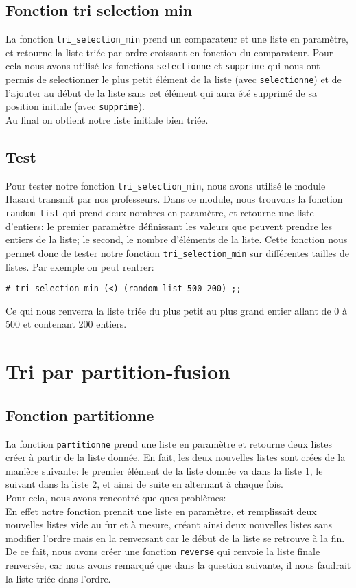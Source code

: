 \documentclass[a4paper, 11pt]{article}
\begin{document}
\subsection{Fonction tri selection min}
La fonction \texttt{tri\_selection\_min} prend un comparateur et une liste en paramètre, et retourne la liste triée par ordre croissant en fonction du comparateur. Pour cela nous avons utilisé les fonctions \texttt{selectionne} et \texttt{supprime} qui nous ont permis de selectionner le plus petit élément de la liste (avec \texttt{selectionne}) et de l'ajouter au début de la liste sans cet élément qui aura été supprimé de sa position initiale (avec \texttt{supprime}).\\
Au final on obtient notre liste initiale bien triée.
\subsection{Test}
Pour tester notre fonction \texttt{tri\_selection\_min}, nous avons utilisé le module Hasard transmit par nos professeurs. Dans ce module, nous trouvons la fonction \texttt{random\_list} qui prend deux nombres en paramètre, et retourne une liste d'entiers: le premier paramètre définissant les valeurs que peuvent prendre les entiers de la liste; le second, le nombre d'éléments de la liste.
Cette fonction nous permet donc de tester notre fonction \texttt{tri\_selection\_min} sur différentes tailles de listes. Par exemple on peut rentrer:\begin{verbatim}
# tri_selection_min (<) (random_list 500 200) ;;
\end{verbatim} 
Ce qui nous renverra la liste triée du plus petit au plus grand entier allant de 0 à 500 et contenant 200 entiers.
\section{Tri par partition-fusion}
\subsection{Fonction partitionne}
La fonction \texttt{partitionne} prend une liste en paramètre et retourne deux listes créer à partir de la liste donnée. En fait, les deux nouvelles listes sont crées de la manière suivante: le premier élément de la liste donnée va dans la liste 1, le suivant dans la liste 2, et ainsi de suite en alternant à chaque fois.\\ Pour cela, nous avons rencontré quelques problèmes: \\
En effet notre fonction prenait une liste en paramètre, et remplissait deux nouvelles listes vide au fur et à mesure, créant ainsi deux nouvelles listes sans modifier l'ordre mais en la renversant car le début de la liste se retrouve à la fin.\\
De ce fait, nous avons créer une fonction \texttt{reverse} qui renvoie la liste finale renversée, car nous avons remarqué que dans la question suivante, il nous faudrait la liste triée dans l'ordre.
\end{document}

